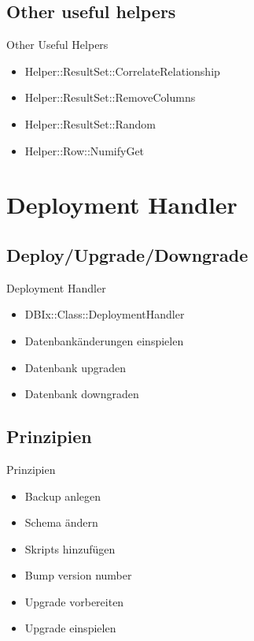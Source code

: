 \subsection{Other useful helpers}
\begin{frame}{Other Useful Helpers}
\begin{itemize}
\item Helper::ResultSet::CorrelateRelationship
\item Helper::ResultSet::RemoveColumns
\item Helper::ResultSet::Random
\item Helper::Row::NumifyGet
\end{itemize}
\end{frame}


\section{Deployment Handler}

\subsection{Deploy/Upgrade/Downgrade}

\begin{frame}{Deployment Handler}
\begin{itemize}
\item DBIx::Class::DeploymentHandler
\item Datenbankänderungen einspielen
\item Datenbank upgraden
\item Datenbank downgraden
\end{itemize}
\end{frame}

\subsection{Prinzipien}

\begin{frame}{Prinzipien}
\begin{itemize}
\item Backup anlegen
\item Schema ändern
\item Skripts hinzufügen
\item Bump version number
\item Upgrade vorbereiten
\item Upgrade einspielen
\end{itemize}
\end{frame}

